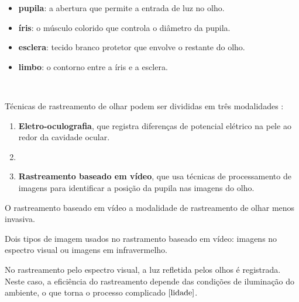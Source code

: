 \begin{itemize}
\item \textbf{pupila}: a abertura que permite a entrada de luz no olho.
\item \textbf{íris}: o músculo colorido que controla o diâmetro da pupila.
\item \textbf{esclera}: tecido branco protetor que envolve o restante do olho.
\item \textbf{limbo}: o contorno entre a íris e a esclera.
\end{itemize}


~ %

Técnicas de rastreamento de olhar podem ser divididas em três modalidades \cite{valenti2009webcam}:

\begin{enumerate}
\item {\bf Eletro-oculografia}, que registra diferenças de potencial elétrico na pele ao redor da cavidade ocular.
\item {} 

\item  {\bf Rastreamento baseado em vídeo}, que usa técnicas de processamento de imagens para identificar a posição da pupila nas imagens do olho.
\end{enumerate}

O rastreamento baseado em vídeo  a modalidade de rastreamento de olhar menos invasiva.

Dois tipos de imagem   usados no rastramento baseado em vídeo: imagens no espectro visual ou imagens em infravermelho.

No rastreamento pelo espectro visual, a luz refletida pelos olhos é registrada. Neste caso, a eficiência do rastreamento depende das condições de iluminação do ambiente, o que torna o processo complicado $\cite{lidade}$.

